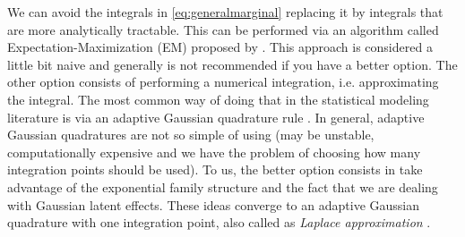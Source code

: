 We can avoid the integrals in \autoref{eq:generalmarginal} replacing it
by integrals that are more analytically tractable. This can be performed
via an algorithm called Expectation-Maximization (EM) proposed by
. This approach is considered a little bit naive and
generally is not recommended if you have a better option. The other
option consists of performing a numerical integration, i.e.
approximating the integral. The most common way of doing that in the
statistical modeling literature is via an adaptive Gaussian quadrature
rule \cite{quadrature}. In general, adaptive Gaussian quadratures are
not so simple of using (may be unstable, computationally expensive and
we have the problem of choosing how many integration points should be
used). To us, the better option consists in take advantage of the
exponential family structure and the fact that we are dealing with
Gaussian latent effects. These ideas converge to an adaptive Gaussian
quadrature with one integration point, also called as \textit{Laplace
  approximation} \cite{molenberghs&verbeke, LA4H, tierney, corestats}.

